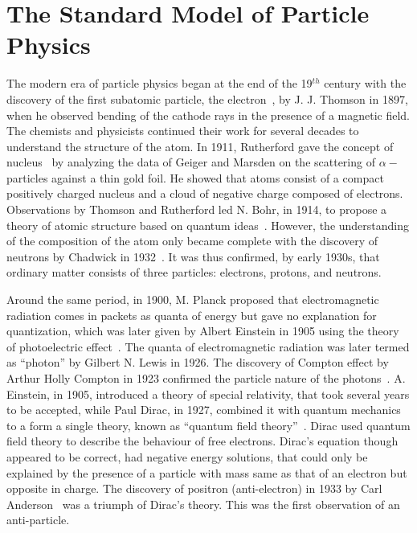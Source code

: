 \section{The Standard Model of Particle Physics}
The modern era of particle physics began at the end of the 19$^{th}$ century with the discovery of the first subatomic particle, 
the electron~\cite{ElectronDiscovery}, by J. J. Thomson in 1897, when he observed bending of the cathode rays in the presence of a magnetic field. 
The chemists and physicists continued their work for several decades to understand the structure of the atom. In 1911, Rutherford gave the concept 
of nucleus~\cite{Rutherford:1911zz,Rutherford1913} by analyzing the data of Geiger and Marsden on the scattering of $\alpha-$particles against a 
thin gold foil. He showed that atoms consist of a compact positively charged nucleus and a cloud of negative charge composed of electrons. Observations 
by Thomson and Rutherford led N. Bohr, in 1914, to propose a theory of atomic structure based on quantum ideas~\cite{Bohr1913}. However, the 
understanding of the composition of the atom only became complete with the discovery of neutrons by Chadwick in 1932~\cite{Chadwick1932}. It was 
thus confirmed, by early 1930s, that ordinary matter consists of three particles: electrons, protons, and neutrons. 

Around the same period, in 1900, M. Planck proposed that electromagnetic radiation comes in packets as quanta of energy but gave no explanation
for quantization, which was later given by Albert Einstein in 1905 using the theory of photoelectric effect~\cite{Einstein:1905ve}. The quanta of 
electromagnetic radiation was later termed as ``photon'' by Gilbert N. Lewis in 1926. The discovery of Compton effect by Arthur Holly Compton in 1923
confirmed the particle nature of the photons~\cite{Compton:1923zz}. A. Einstein, in 1905, introduced a theory of special relativity, that took
several years to be accepted, while Paul Dirac, in 1927, combined it with quantum mechanics to a form a single theory, known as ``quantum field 
theory''~\cite{Dirac1927}. Dirac used quantum field theory to describe the behaviour of free electrons.
Dirac's equation though appeared to be correct, had negative energy solutions, that could only be explained by the presence of a particle with mass 
same as that of an electron but opposite in charge. The discovery of positron (anti-electron) in 1933 by Carl Anderson~\cite{Anderson:1933mb} was 
a triumph of Dirac's theory. This was the first observation of an anti-particle.

